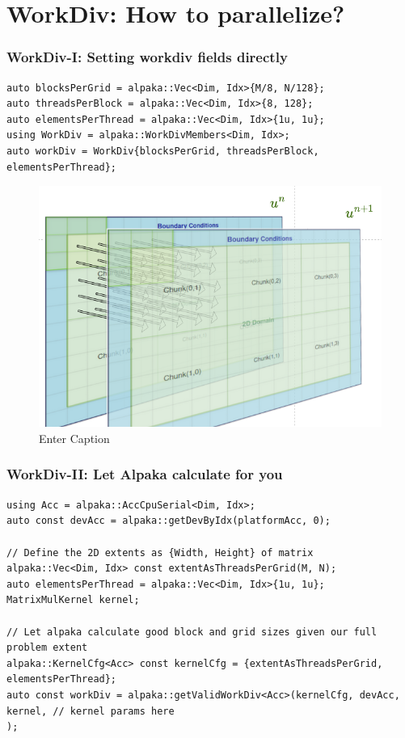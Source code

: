 \documentclass[9pt]{beamer}
\begin{document}
\section{WorkDiv: How to parallelize? }

\begin{frame}[fragile]
\frametitle{WorkDiv-I: Setting workdiv fields directly}

\begin{lstlisting}
auto blocksPerGrid = alpaka::Vec<Dim, Idx>{M/8, N/128};
auto threadsPerBlock = alpaka::Vec<Dim, Idx>{8, 128};
auto elementsPerThread = alpaka::Vec<Dim, Idx>{1u, 1u};
using WorkDiv = alpaka::WorkDivMembers<Dim, Idx>;
auto workDiv = WorkDiv{blocksPerGrid, threadsPerBlock, elementsPerThread};
\end{lstlisting}

\begin{figure}
    \centering
    \includegraphics[width=0.75\linewidth]{Screenshot from 2024-09-04 13-55-10.png}
    \caption{Enter Caption}
    \label{fig:enter-label}
\end{figure}
\end{frame}


\begin{frame}[fragile]
\frametitle{WorkDiv-II: Let Alpaka calculate for you}

\begin{lstlisting}
using Acc = alpaka::AccCpuSerial<Dim, Idx>;
auto const devAcc = alpaka::getDevByIdx(platformAcc, 0);

// Define the 2D extents as {Width, Height} of matrix
alpaka::Vec<Dim, Idx> const extentAsThreadsPerGrid(M, N);
auto elementsPerThread = alpaka::Vec<Dim, Idx>{1u, 1u};
MatrixMulKernel kernel;

// Let alpaka calculate good block and grid sizes given our full problem extent
alpaka::KernelCfg<Acc> const kernelCfg = {extentAsThreadsPerGrid, elementsPerThread};
auto const workDiv = alpaka::getValidWorkDiv<Acc>(kernelCfg, devAcc, kernel, // kernel params here
);
\end{lstlisting}
\end{frame}
\end{document}
